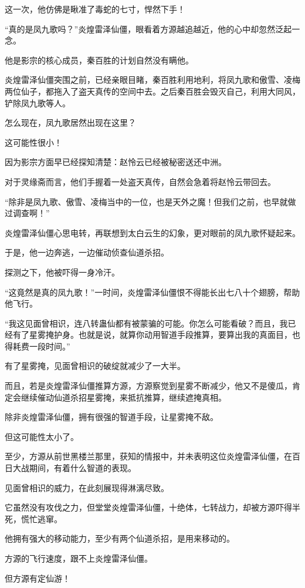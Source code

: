 \begin{this_body}
这一次，他仿佛是瞅准了毒蛇的七寸，悍然下手！

“真的是凤九歌吗？”炎煌雷泽仙僵，眼看着方源越追越近，他的心中却忽然泛起一念。

他是影宗的核心成员，秦百胜的计划自然没有瞒他。

炎煌雷泽仙僵突围之前，已经亲眼目睹，秦百胜利用地利，将凤九歌和傲雪、凌梅两位仙子，都拖入了盗天真传的空间中去。之后秦百胜会毁灭自己，利用大同风，铲除凤九歌等人。

怎么现在，凤九歌居然出现在这里？

这可能性很小！

因为影宗方面早已经探知清楚：赵怜云已经被秘密送还中洲。

对于灵缘斋而言，他们手握着一处盗天真传，自然会急着将赵怜云带回去。

“除非是凤九歌、傲雪、凌梅当中的一位，也是天外之魔！但我们之前，也早就做过调查啊！”

炎煌雷泽仙僵心思电转，再联想到太白云生的幻象，更对眼前的凤九歌怀疑起来。

于是，他一边奔逃，一边催动侦查仙道杀招。

探测之下，他被吓得一身冷汗。

“这竟然是真的凤九歌！”一时间，炎煌雷泽仙僵恨不得能长出七八十个翅膀，帮助他飞行。

“我这见面曾相识，连八转蛊仙都有被蒙骗的可能。你怎么可能看破？而且，我已经有了星雾掩护身。也就是说，就算你动用智道手段推算，要算出我的真面目，也得耗费一段时间。”

有了星雾掩，见面曾相识的破绽就减少了一大半。

而且，若是炎煌雷泽仙僵推算方源，方源察觉到星雾不断减少，他又不是傻瓜，肯定会继续催动仙道杀招星雾掩，来抵抗推算，继续遮掩真相。

除非炎煌雷泽仙僵，拥有很强的智道手段，让星雾掩不敌。

但这可能性太小了。

至少，方源从前世黑楼兰那里，获知的情报中，并未表明这位炎煌雷泽仙僵，在百日大战期间，有着什么智道的表现。

见面曾相识的威力，在此刻展现得淋漓尽致。

它虽然没有攻伐之力，但堂堂炎煌雷泽仙僵，十绝体，七转战力，却被方源吓得半死，慌忙逃窜。

他拥有强大的移动能力，至少有两个仙道杀招，是用来移动的。

方源的飞行速度，跟不上炎煌雷泽仙僵。

但方源有定仙游！


\end{this_body}
